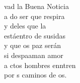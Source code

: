 \begin{cancion}%
	vad la Buena Noticia\\
	a do ser que respira\\
	y deles que la \\
	estáentro de susidas\\
	y que os paz serán\\
	si despaaman amor\\
	a ctos hombres enntren\\
	por s caminos de os.\\
\end{cancion}%
